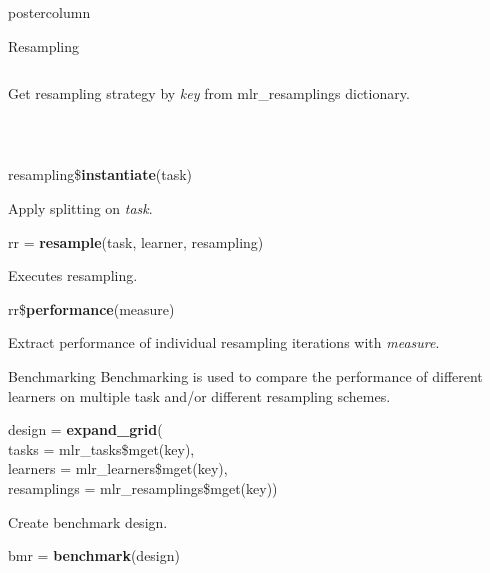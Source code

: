 \documentclass{beamer}
\begin{document}
\begin{frame}[fragile]{}
\begin{columns}
\begin{column}{.245\textwidth}
\begin{beamercolorbox}[center]{postercolumn}
\begin{minipage}{.98\textwidth}
{\begin{myblock}{Resampling}
\begin{minipage}{\textwidth}
\begin{columns}[T]
\begin{column}{0.8\textwidth}
\begin{codebox}
										\end{codebox}
										\hspace*{1ex}Get resampling strategy by \textit{key} from mlr\_resamplings \hspace*{1ex}dictionary.
								\end{column}
							\end{columns}
						\end{minipage}
						\\[\baselineskip]
						\begin{codebox}
							resampling\$\textbf{instantiate}(task)
						\end{codebox}
						\hspace*{1ex}Apply splitting on \textit{task}.
						\\
						\begin{codebox}
							rr = \textbf{resample}(task, learner, resampling)
						\end{codebox}
						\hspace*{1ex}Executes resampling.
						\\
						\begin{codebox}
							rr\$\textbf{performance}(measure)
						\end{codebox}
						\hspace*{1ex}Extract performance of individual resampling iterations with \textit{measure}.
					\end{myblock}
				\begin{myblock}{Benchmarking}
						Benchmarking is used to compare the performance of different learners on multiple task and/or different resampling schemes.
						\\
						\begin{codeboxmultiline}[width=21.95cm]
							design = \textbf{expand\_grid}(\\
							\hspace*{1ex}tasks = mlr\_tasks\$mget(key),\\
							\hspace*{1ex}learners = mlr\_learners\$mget(key),\\
							\hspace*{1ex}resamplings = mlr\_resamplings\$mget(key))
						\end{codeboxmultiline}
						\hspace*{1ex}Create benchmark design.
						\\
						\begin{codebox}
							bmr = \textbf{benchmark}(design)
						\end{codebox}

\end{myblock}}
\end{minipage}
\end{beamercolorbox}
\end{column}
\end{columns}
\end{frame}
\end{document}
